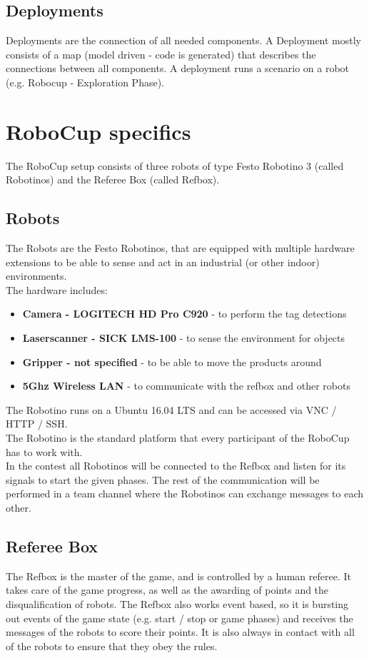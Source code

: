 \subsection{Deployments}
\label{subsec:Deployments}
Deployments are the connection of all needed components.
A Deployment mostly consists of a map (model driven - code is generated) that describes the connections between all components.
A deployment runs a scenario on a robot (e.g. Robocup - Exploration Phase).

\section{RoboCup specifics}
The RoboCup setup consists of three robots of type Festo Robotino 3 (called Robotinos) and the Referee Box (called Refbox).

\subsection{Robots}
The Robots are the Festo Robotinos, that are equipped with multiple hardware extensions to be able to sense and act
in an industrial (or other indoor) environments.\\
The hardware includes:
\begin{itemize}
    \item \textbf{Camera - LOGITECH HD Pro C920} - to perform the tag detections
    \item \textbf{Laserscanner - SICK LMS-100} - to sense the environment for objects
    \item \textbf{Gripper -  not specified} - to be able to move the products around%
    \item \textbf{5Ghz Wireless LAN} - to communicate with the refbox and other robots
\end{itemize}

The Robotino runs on a Ubuntu 16.04 LTS and can be accessed via VNC / HTTP / SSH.\\

The Robotino is the standard platform that every participant of the RoboCup has to work with.\\
In the contest all Robotinos will be connected to the Refbox and listen for its signals to start the given phases.
The rest of the communication will be performed in a team channel where the Robotinos can exchange messages to each other.
\newpage

\subsection{Referee Box}
The Refbox is the master of the game, and is controlled by a human referee. It takes care of the game progress, as well as the awarding of points and the disqualification of robots.
The Refbox also works event based, so it is bursting out events of the game state (e.g. start / stop or game phases) and receives the messages of the robots to score their points.
It is also always in contact with all of the robots to ensure that they obey the rules.
